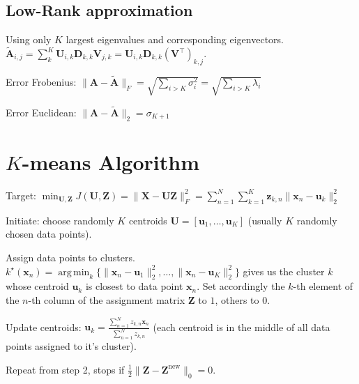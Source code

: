 \documentclass[a4paper, 11pt, landscape]{article}
\DeclareMathOperator*{\argmin}{arg\,min}
\begin{document}
\begin{multicols*}{3}
\subsection{Low-Rank approximation}
Using only $K$ largest eigenvalues and corresponding eigenvectors. $\tilde{\mathbf{A}}_{i, j} = \sum_{k}^K \mathbf{U}_{i, k} \mathbf{D}_{k,k} \mathbf{V}_{j, k} = \mathbf{U}_{i, k} \mathbf{D}_{k,k} (\mathbf{V}^\top)_{k, j}$.
\begin{compactdesc}
	\item[Error Frobenius:] $\|\mathbf{A} - \tilde{\mathbf{A}}\|_F = \sqrt{\sum_{i > K} \sigma_i^2} = \sqrt{\sum_{i > K} \lambda_i}$
	\item[Error Euclidean:] $\|\mathbf{A} - \tilde{\mathbf{A}}\|_2 = \sigma_{K+1}$
\end{compactdesc}

\section{$K$-means Algorithm}
\begin{inparadesc}
	\item[\color{red}Target:] $\min_{\mathbf{U}, \mathbf{Z}} J(\mathbf{U}, \mathbf{Z}) = \|\mathbf{X} - \mathbf{U} \mathbf{Z}\|_F^2 = \sum_{n=1}^N \sum_{k=1}^K \mathbf{z}_{k,n} \|\mathbf{x}_n - \mathbf{u}_k\|_2^2$
\end{inparadesc}
\begin{inparaenum}
	\item Initiate: choose randomly $K$ centroids $\mathbf{U} = [\mathbf{u}_1, \ldots, \mathbf{u}_K]$ (usually $K$ randomly chosen data points).
	\item Assign data points to clusters. $k^\star(\mathbf{x}_n) = \argmin_k \{ \|\mathbf{x}_n - \mathbf{u}_1\|_2^2, \ldots, \|\mathbf{x}_n - \mathbf{u}_K\|_2^2 \}$ gives us the cluster $k$ whose centroid $\mathbf{u}_k$ is closest to data point $\mathbf{x}_n$. Set accordingly the $k$-th element of the $n$-th column of the assignment matrix $\mathbf{Z}$ to $1$, others to $0$.
	\item Update centroids: $\mathbf{u}_k = \frac{\sum_{n=1}^N z_{k,n} \mathbf{x}_n}{\sum_{n=1}^N z_{k,n}}$ (each centroid is in the middle of all data points assigned to it's cluster).
	\item Repeat from step 2, stops if $\frac{1}{2} \|\mathbf{Z} - \mathbf{Z}^\text{new}\|_0 = 0$.
\end{inparaenum}



\end{multicols*}
\end{document}
